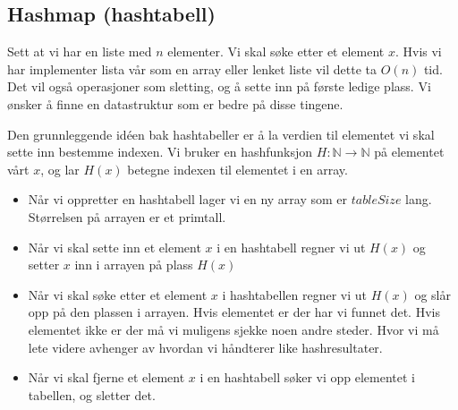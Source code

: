 \begin{example}
\begin{figure}[H]
		\end{figure}
\end{example}







\subsection{Hashmap (hashtabell)} \label{hashmap}
Sett at vi har en liste med $ n $ elementer. Vi skal søke etter et element $ x $. Hvis vi har implementer lista vår som en array eller lenket liste vil dette ta $ O(n) $ tid. Det vil også operasjoner som sletting, og å sette inn på første ledige plass. Vi ønsker å finne en datastruktur som er bedre på disse tingene. 

Den grunnleggende idéen bak hashtabeller er å la verdien til elementet vi skal sette inn bestemme indexen. Vi bruker en hashfunksjon $ H:\mathbb{N}\rightarrow\mathbb{N} $ på elementet vårt $ x $, og lar $ H(x) $ betegne indexen til elementet i en array. 

\begin{itemize}
\item Når vi oppretter en hashtabell lager vi en ny array som er $ tableSize $ lang. Størrelsen på arrayen er et primtall. 
\item Når vi skal sette inn et element $ x $ i en hashtabell regner vi ut $ H(x) $ og setter $ x $ inn i arrayen på plass $ H(x) $
\item Når vi skal søke etter et element $ x $ i hashtabellen regner vi ut $ H(x) $ og slår opp på den plassen i arrayen. Hvis elementet er der har vi funnet det. Hvis elementet ikke er der må vi muligens sjekke noen andre steder. Hvor vi må lete videre avhenger av hvordan vi håndterer like hashresultater. 
\item Når vi skal fjerne et element $ x $ i en hashtabell søker vi opp elementet i tabellen, og sletter det. 
\end{itemize}

